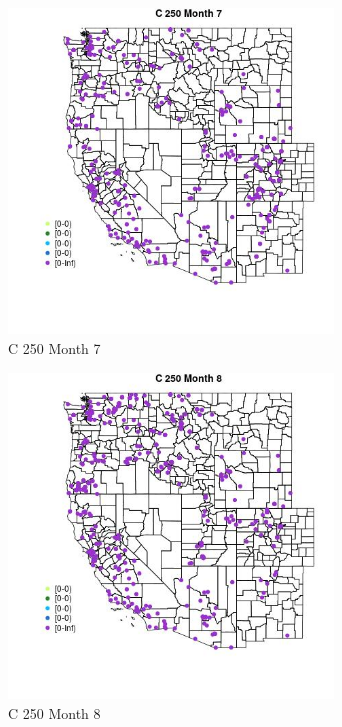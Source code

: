\begin{figure} 
\centering  
\includegraphics[width=0.77\textwidth]{Code_Outputs/Report_ML_input_PM25_Step4_part_e_de_duplicated_aveswNAs_MapObsMo7C_250.jpg} 
\caption{\label{fig:Report_ML_input_PM25_Step4_part_e_de_duplicated_aveswNAsMapObsMo7C_250}C 250 Month 7} 
\end{figure} 
 

\begin{figure} 
\centering  
\includegraphics[width=0.77\textwidth]{Code_Outputs/Report_ML_input_PM25_Step4_part_e_de_duplicated_aveswNAs_MapObsMo8C_250.jpg} 
\caption{\label{fig:Report_ML_input_PM25_Step4_part_e_de_duplicated_aveswNAsMapObsMo8C_250}C 250 Month 8} 
\end{figure} 
 

